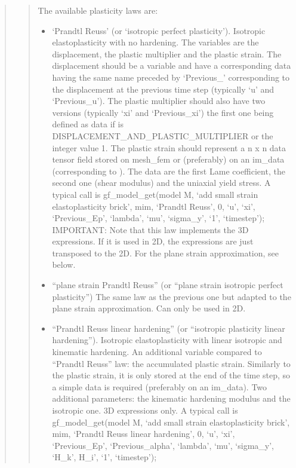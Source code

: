 \documentclass[a4paper,11pt,english]{sphinxmanual}
\begin{document}
\begin{quote}
\begin{quote}
The available plasticity laws are:
\begin{itemize}
\item {} 
‘Prandtl Reuss’ (or ‘isotropic perfect plasticity’).
Isotropic elasto\sphinxhyphen{}plasticity with no hardening. The variables are the
displacement, the plastic multiplier and the plastic strain.
The displacement should be a variable and have a corresponding data
having the same name preceded by ‘Previous\_’ corresponding to the
displacement at the previous time step (typically ‘u’ and ‘Previous\_u’).
The plastic multiplier should also have two versions (typically ‘xi’
and ‘Previous\_xi’) the first one being defined as data if
 is DISPLACEMENT\_AND\_PLASTIC\_MULTIPLIER
or the integer value 1.
The plastic strain should represent a n x n data tensor field stored
on mesh\_fem or (preferably) on an im\_data (corresponding to ).
The data are the first Lame coefficient, the second one (shear modulus)
and the uniaxial yield stress. A typical call is
gf\_model\_get(model M, ‘add small strain elastoplasticity brick’, mim, ‘Prandtl Reuss’, 0, ‘u’, ‘xi’, ‘Previous\_Ep’, ‘lambda’, ‘mu’, ‘sigma\_y’, ‘1’, ‘timestep’);
IMPORTANT: Note that this law implements
the 3D expressions. If it is used in 2D, the expressions are just
transposed to the 2D. For the plane strain approximation, see below.

\item {} 
“plane strain Prandtl Reuss”
(or “plane strain isotropic perfect plasticity”)
The same law as the previous one but adapted to the plane strain
approximation. Can only be used in 2D.

\item {} 
“Prandtl Reuss linear hardening”
(or “isotropic plasticity linear hardening”).
Isotropic elasto\sphinxhyphen{}plasticity with linear isotropic and kinematic
hardening. An additional variable compared to “Prandtl Reuss” law:
the accumulated plastic strain. Similarly to the plastic strain, it
is only stored at the end of the time step, so a simple data is
required (preferably on an im\_data).
Two additional parameters: the kinematic hardening modulus and the
isotropic one. 3D expressions only. A typical call is
gf\_model\_get(model M, ‘add small strain elastoplasticity brick’, mim, ‘Prandtl Reuss linear hardening’, 0, ‘u’, ‘xi’, ‘Previous\_Ep’, ‘Previous\_alpha’, ‘lambda’, ‘mu’, ‘sigma\_y’, ‘H\_k’, H\_i’, ‘1’, ‘timestep’);


\end{itemize}
\end{quote}
\end{quote}
\end{document}
